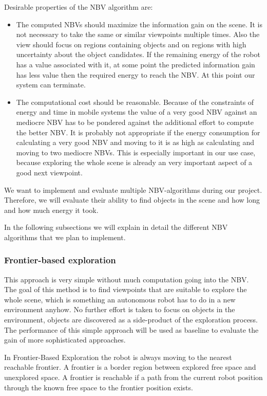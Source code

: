 \documentclass[a4paper,11pt,english]{article}
\begin{document}
Desirable properties of the NBV algorithm are:
\begin{itemize}
	\item The computed NBVs should maximize the information gain on the scene. It is not necessary to take the same or similar viewpoints multiple times. Also the view should focus on regions containing objects and on regions with high uncertainty about the object candidates. If the remaining energy of the robot has a value associated with it, at some point the predicted information gain has less value then the required energy to reach the NBV. At this point our system can terminate.
	\item The computational cost should be reasonable. Because of the constraints of energy and time in mobile systems the value of a very good NBV against an mediocre NBV has to be pondered against the additional effort to compute the better NBV. It is probably not appropriate if the energy consumption for calculating a very good NBV and moving to it is as high as calculating and moving to two mediocre NBVs. This is especially important in our use case, because exploring the whole scene is already an very important aspect of a good next viewpoint.
\end{itemize}

We want to implement and evaluate multiple NBV-algorithms during our project.
Therefore, we will evaluate their ability to find objects in the scene and how long and how much energy it took.

In the following subsections we will explain in detail the different NBV algorithms that we plan to implement.

\subsubsection{Frontier-based exploration}
This approach is very simple without much computation going into the NBV.
The goal of this method is to find viewpoints that are suitable to explore the whole scene, which is something an autonomous robot has to do in a new environment anyhow.
No further effort is taken to focus on objects in the environment, objects are discovered as a side-product of the exploration process.
The performance of this simple approach will be used as baseline to evaluate the gain of more sophisticated approaches.

In Frontier-Based Exploration the robot is always moving to the nearest reachable frontier.
A frontier is a border region between explored free space and unexplored space.
A frontier is reachable if a path from the current robot position through the known free space to the frontier position exists.
\end{document}
